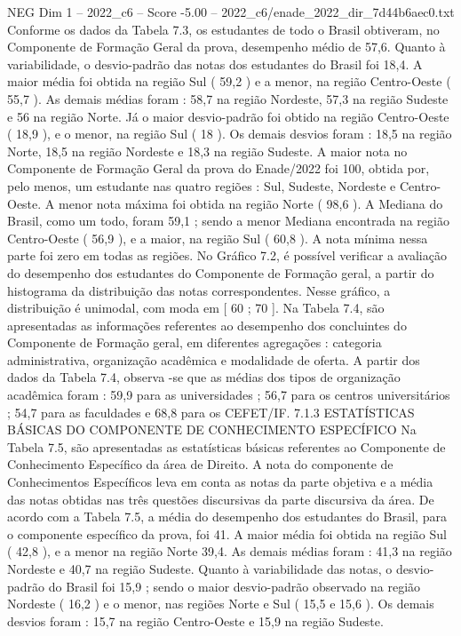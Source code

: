 \begin{textsample}{NEG Dim 1 – 2022\_c6 – Score -5.00 – 2022\_c6/enade\_2022\_dir\_7d44b6aec0.txt}
Conforme os dados da Tabela 7.3, os estudantes de todo o Brasil obtiveram, no Componente de Formação Geral da prova, desempenho médio de 57,6.
Quanto à variabilidade, o desvio-padrão das notas dos estudantes do Brasil foi 18,4.
A maior média foi obtida na região Sul ( 59,2 ) e a menor, na região Centro-Oeste ( 55,7 ).
As demais médias foram : 58,7 na região Nordeste, 57,3 na região Sudeste e 56 na região Norte.
Já o maior desvio-padrão foi obtido na região Centro-Oeste ( 18,9 ), e o menor, na região Sul ( 18 ).
Os demais desvios foram : 18,5 na região Norte, 18,5 na região Nordeste e 18,3 na região Sudeste.
A maior nota no Componente de Formação Geral da prova do Enade/2022 foi 100, obtida por, pelo menos, um estudante nas quatro regiões : Sul, Sudeste, Nordeste e Centro-Oeste.
A menor nota máxima foi obtida na região Norte ( 98,6 ).
A Mediana do Brasil, como um todo, foram 59,1 ; sendo a menor Mediana encontrada na região Centro-Oeste ( 56,9 ), e a maior, na região Sul ( 60,8 ).
A nota mínima nessa parte foi zero em todas as regiões.
No Gráfico 7.2, é possível verificar a avaliação do desempenho dos estudantes do Componente de Formação geral, a partir do histograma da distribuição das notas correspondentes.
Nesse gráfico, a distribuição é unimodal, com moda em [ 60 ; 70 ].
Na Tabela 7.4, são apresentadas as informações referentes ao desempenho dos concluintes do Componente de Formação geral, em diferentes agregações : categoria administrativa, organização acadêmica e modalidade de oferta.
A partir dos dados da Tabela 7.4, observa -se que as médias dos tipos de organização acadêmica foram : 59,9 para as universidades ; 56,7 para os centros universitários ; 54,7 para as faculdades e 68,8 para os CEFET/IF. 7.1.3 ESTATÍSTICAS BÁSICAS DO COMPONENTE DE CONHECIMENTO ESPECÍFICO Na Tabela 7.5, são apresentadas as estatísticas básicas referentes ao Componente de Conhecimento Específico da área de Direito.
A nota do componente de Conhecimentos Específicos leva em conta as notas da parte objetiva e a média das notas obtidas nas três questões discursivas da parte discursiva da área.
De acordo com a Tabela 7.5, a média do desempenho dos estudantes do Brasil, para o componente específico da prova, foi 41.
A maior média foi obtida na região Sul ( 42,8 ), e a menor na região Norte 39,4.
As demais médias foram : 41,3 na região Nordeste e 40,7 na região Sudeste.
Quanto à variabilidade das notas, o desvio-padrão do Brasil foi 15,9 ; sendo o maior desvio-padrão observado na região Nordeste ( 16,2 ) e o menor, nas regiões Norte e Sul ( 15,5 e 15,6 ).
Os demais desvios foram : 15,7 na região Centro-Oeste e 15,9 na região Sudeste.

\end{textsample}
